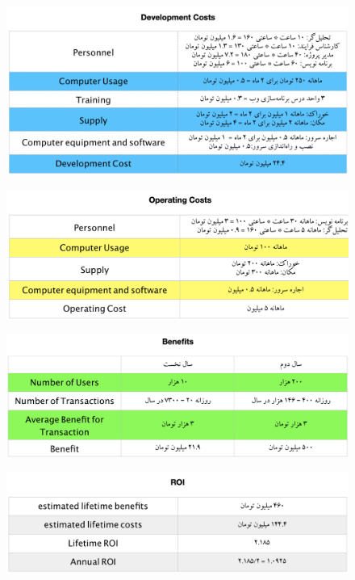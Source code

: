 \documentclass{article}
\begin{document}
\begin{center}

\begin{figure}[htp]
\includegraphics[width = 1\textwidth]{Dev1.png}
\caption{}
\label{dev1}
\end{figure}

\begin{figure}[htp]
\includegraphics[width = 1\textwidth]{Op1.png}
\caption{}
\label{op1}
\end{figure}

\begin{figure}[htp]
\includegraphics[width = 1\textwidth]{Ben1.png}
\caption{}
\label{ben1}
\end{figure}

\begin{figure}[htp]
\includegraphics[width = 1\textwidth]{ROI1.png}
\caption{}
\label{roi1}
\end{figure}


\end{center}
\end{document}
